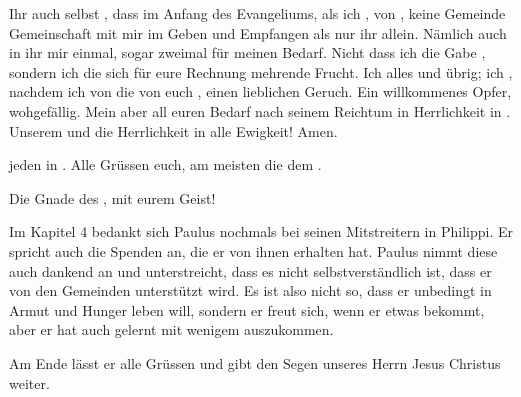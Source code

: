 Ihr  auch selbst  , dass im Anfang  des Evangeliums, als ich , von , keine Gemeinde Gemeinschaft  mit mir im   Geben und Empfangen als nur ihr allein. Nämlich auch in   ihr mir einmal, sogar zweimal  für meinen Bedarf. Nicht dass ich die Gabe , sondern ich  die sich für eure Rechnung mehrende Frucht. Ich  alles  und  übrig; ich  , nachdem ich von  die  von euch  , einen lieblichen Geruch. Ein willkommenes Opfer,  wohgefällig. Mein  aber  all euren Bedarf  nach seinem Reichtum in Herrlichkeit in . Unserem  und   die Herrlichkeit in alle Ewigkeit! Amen.

 jeden  in . Alle  Grüssen euch, am meisten die dem .

Die Gnade des ,  mit eurem Geist!
\hr
\begin{otsblock}
    \begin{itshape}
        Im Kapitel 4 bedankt sich Paulus nochmals bei seinen Mitstreitern in Philippi. Er spricht auch die Spenden an, die er von ihnen erhalten hat. Paulus nimmt diese auch dankend an und unterstreicht, dass es nicht selbstverständlich ist, dass er von den Gemeinden unterstützt wird. Es ist also nicht so, dass er unbedingt in Armut und Hunger leben will, sondern er freut sich, wenn er etwas bekommt, aber er hat auch gelernt mit wenigem auszukommen.
        
        Am Ende lässt er alle Grüssen und gibt den Segen unseres Herrn Jesus Christus weiter.
    \end{itshape}
\end{otsblock}